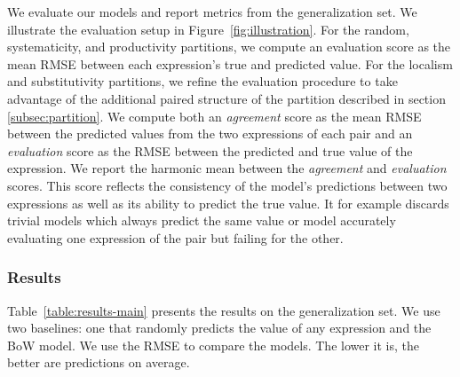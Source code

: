 We evaluate our models and report metrics from the generalization set. We illustrate the evaluation setup in Figure~\ref{fig:illustration}. For the random, systematicity, and productivity partitions, we compute an evaluation score as the mean RMSE between each expression's true and predicted value. For the localism and substitutivity partitions, we refine the evaluation procedure to take advantage of the additional paired structure of the partition described in section \ref{subsec:partition}. We compute both an \textit{agreement} score as the mean RMSE between the predicted values from the two expressions of each pair and an \textit{evaluation} score as the RMSE between the predicted and true value of the expression. We report the harmonic mean between the \textit{agreement} and \textit{evaluation} scores. This score reflects the consistency of the model's predictions between two expressions as well as its ability to predict the true value. It for example discards trivial models which always predict the same value or model accurately evaluating one expression of the pair but failing for the other.


\subsubsection{Results}
\label{sec:results}


Table~\ref{table:results-main} presents the results on the generalization set. We use two baselines: one that randomly predicts the value of any expression and the BoW model. We use the RMSE to compare the models. The lower it is, the better are predictions on average.

